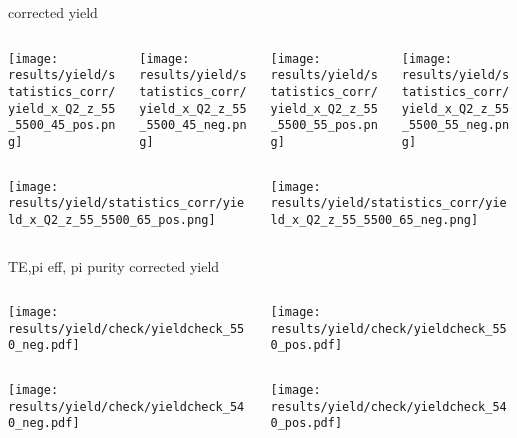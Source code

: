 \begin{frame}{corrected yield}
\begin{columns}
\begin{column}[T]{0.25\textwidth}
\texttt{[image: results/yield/statistics\_corr/yield\_x\_Q2\_z\_55\_5500\_45\_pos.png]}
\end{column}
\begin{column}[T]{0.25\textwidth}
\texttt{[image: results/yield/statistics\_corr/yield\_x\_Q2\_z\_55\_5500\_45\_neg.png]}
\end{column}
\begin{column}[T]{0.25\textwidth}
\texttt{[image: results/yield/statistics\_corr/yield\_x\_Q2\_z\_55\_5500\_55\_pos.png]}
\end{column}
\begin{column}[T]{0.25\textwidth}
\texttt{[image: results/yield/statistics\_corr/yield\_x\_Q2\_z\_55\_5500\_55\_neg.png]}
\end{column}
\end{columns}
\begin{columns}
\begin{column}[T]{0.25\textwidth}
\texttt{[image: results/yield/statistics\_corr/yield\_x\_Q2\_z\_55\_5500\_65\_pos.png]}
\end{column}
\begin{column}[T]{0.25\textwidth}
\texttt{[image: results/yield/statistics\_corr/yield\_x\_Q2\_z\_55\_5500\_65\_neg.png]}
\end{column}
\end{columns}
\end{frame}
\begin{frame}{TE,pi eff, pi purity corrected yield}
\begin{columns}
\begin{column}[T]{0.5\textwidth}
\texttt{[image: results/yield/check/yieldcheck\_550\_neg.pdf]}
\end{column}
\begin{column}[T]{0.5\textwidth}
\texttt{[image: results/yield/check/yieldcheck\_550\_pos.pdf]}
\end{column}
\end{columns}
\begin{columns}
\begin{column}[T]{0.5\textwidth}
\texttt{[image: results/yield/check/yieldcheck\_540\_neg.pdf]}
\end{column}
\begin{column}[T]{0.5\textwidth}
\texttt{[image: results/yield/check/yieldcheck\_540\_pos.pdf]}
\end{column}
\end{columns}
\end{frame}
